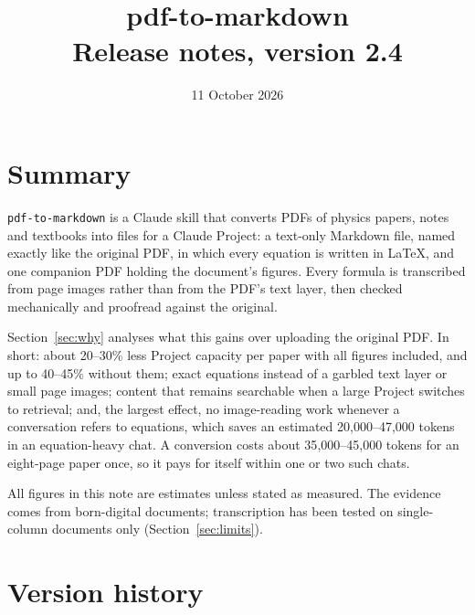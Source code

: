 \documentclass[11pt]{article}
\title{\textbf{pdf-to-markdown}\\[2pt]\large Release notes, version 2.4}
\author{}
\date{11 October 2026}
\newcommand{\file}[1]{\texttt{#1}}
\begin{document}
\maketitle
\vspace{-3em}

\section*{Summary}

\file{pdf-to-markdown} is a Claude skill that converts PDFs of physics papers,
notes and textbooks into files for a Claude Project: a text-only Markdown file,
named exactly like the original PDF, in which every equation is written in
LaTeX, and one companion PDF holding the document's figures. Every formula is
transcribed from page images rather than from the PDF's text layer, then checked
mechanically and proofread against the original.

Section~\ref{sec:why} analyses what this gains over uploading the original PDF.
In short: about 20--30\% less Project capacity per paper with all figures
included, and up to 40--45\% without them; exact equations instead of a garbled
text layer or small page images; content that remains searchable when a large
Project switches to retrieval; and, the largest effect, no image-reading work
whenever a conversation refers to equations, which saves an estimated
20{,}000--47{,}000 tokens in an equation-heavy chat. A conversion costs about
35{,}000--45{,}000 tokens for an eight-page paper once, so it pays for itself
within one or two such chats.

All figures in this note are estimates unless stated as measured. The evidence
comes from born-digital documents; transcription has been tested on
single-column documents only (Section~\ref{sec:limits}).

\section*{Version history}
\end{document}
